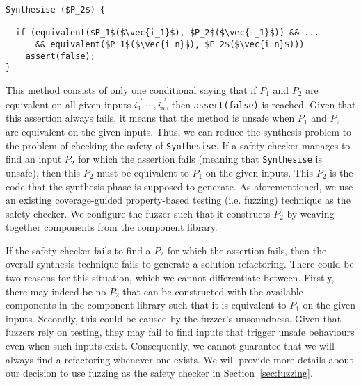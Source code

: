 \documentclass[sigconf,review,anonymous]{acmart}
\begin{document}
\begin{lstlisting}[mathescape=true,showstringspaces=false]
Synthesise ($P_2$) {

  if (equivalent($P_1$($\vec{i_1}$), $P_2$($\vec{i_1}$)) && ...
      && equivalent($P_1$($\vec{i_n}$), $P_2$($\vec{i_n}$)))
    assert(false);
}
\end{lstlisting}

This method consists of only one conditional saying that if $P_1$ and $P_2$ are equivalent on all given inputs $\vec{i_1}, \cdots, \vec{i_n}$, then \texttt{assert(false)} is reached.
Given that this assertion always fails, it means that the method is unsafe when $P_1$ and $P_2$ are equivalent on the given inputs.
Thus, we can reduce the synthesis problem to the problem of checking the safety of \texttt{Synthesise}. If a safety checker manages to
find an input $P_2$ for which the assertion fails (meaning that \texttt{Synthesise} is unsafe), then this $P_2$ must be equivalent to $P_1$ on the given inputs. This $P_2$ is the code
that the synthesis phase is supposed to generate. As aforementioned, we use an existing coverage-guided property-based testing (i.e. fuzzing) technique
as the safety checker. We configure the fuzzer such that it constructs $P_2$ by weaving together components from the component library.

If the safety checker fails to find a $P_2$ for which the assertion fails, then the overall synthesis technique fails to generate a solution refactoring.
There could be two reasons for this situation, which we cannot differentiate between.
Firstly, there may indeed be no $P_2$ that can be constructed with the available components in the component library such that
it is equivalent to $P_1$ on the given inputs. Secondly, this could be caused by the fuzzer's unsoundness.
Given that fuzzers rely on testing, they may fail to find inputs that trigger unsafe behaviours even when such inputs exist.
Consequently, we cannot guarantee that we will always find a refactoring whenever one exists. We will provide more details about our decision to use fuzzing as the safety checker in 
Section~\ref{sec:fuzzing}.


\end{document}
